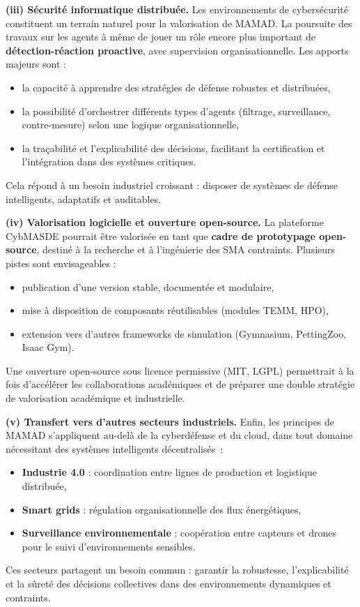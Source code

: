 \medskip
\noindent
\textbf{(iii) Sécurité informatique distribuée.}
Les environnements de cybersécurité constituent un terrain naturel pour la valorisation de MAMAD.
La poursuite des travaux sur les agents  à même de jouer un rôle encore plus important de \textbf{détection-réaction proactive}, avec supervision organisationnelle.
Les apports majeurs sont :
\begin{itemize}
  \item la capacité à apprendre des stratégies de défense robustes et distribuées,
  \item la possibilité d’orchestrer différents types d’agents (filtrage, surveillance, contre-mesure) selon une logique organisationnelle,
  \item la traçabilité et l’explicabilité des décisions, facilitant la certification et l’intégration dans des systèmes critiques.
\end{itemize}
Cela répond à un besoin industriel croissant : disposer de systèmes de défense intelligents, adaptatifs et auditables.

\medskip
\noindent
\textbf{(iv) Valorisation logicielle et ouverture open-source.}
La plateforme \ac{CybMASDE} pourrait être valorisée en tant que \textbf{cadre de prototypage open-source}, destiné à la recherche et à l’ingénierie des SMA contraints.
Plusieurs pistes sont envisageables :
\begin{itemize}
  \item publication d’une version stable, documentée et modulaire,
  \item mise à disposition de composants réutilisables (modules TEMM, HPO),
  \item extension vers d’autres frameworks de simulation (Gymnasium, PettingZoo, Isaac Gym).
\end{itemize}
Une ouverture open-source sous licence permissive (MIT, LGPL) permettrait à la fois d’accélérer les collaborations académiques et de préparer une double stratégie de valorisation académique et industrielle.

\medskip
\noindent
\textbf{(v) Transfert vers d’autres secteurs industriels.}
Enfin, les principes de MAMAD s’appliquent au-delà de la cyberdéfense et du cloud, dans tout domaine nécessitant des systèmes intelligents décentralisés~:
\begin{itemize}
  \item \textbf{Industrie 4.0} : coordination entre lignes de production et logistique distribuée,
  \item \textbf{Smart grids} : régulation organisationnelle des flux énergétiques,
  \item \textbf{Surveillance environnementale} : coopération entre capteurs et drones pour le suivi d’environnements sensibles.
\end{itemize}
Ces secteurs partagent un besoin commun : garantir la robustesse, l’explicabilité et la sûreté des décisions collectives dans des environnements dynamiques et contraints.

